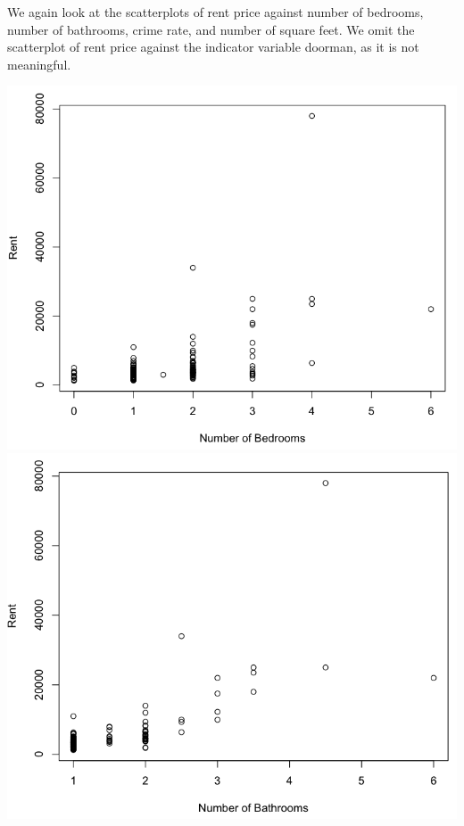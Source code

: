\documentclass[a4 paper, 11 pt, twocolumn]{article}
\begin{document}
We again look at the scatterplots of rent price against number of bedrooms, number of bathrooms, crime rate, and number of square feet. We omit the scatterplot of rent price against the indicator variable doorman, as it is not meaningful.
\begin{center}
\includegraphics[scale=0.35]{scattera}
\includegraphics[scale=0.35]{scatterb}

\end{center}
\end{document}

